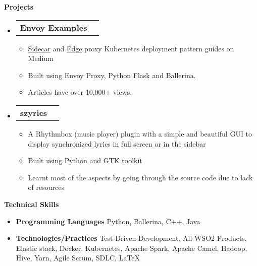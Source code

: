 \documentclass[letterpaper,12pt]{article}[leftmargin=*]
\makeatletter
\def \entryspacing {-0pt}
\renewcommand{\section}[2]{\vspace{5pt}
  \colorbox{secondary}{\color{white}\raggedbottom\normalsize\textbf{{#1}{\hspace{7pt}#2}}}
}
\newcommand{\resumeEntryStart}{\begin{itemize}[leftmargin=2.5mm]}
\newcommand{\resumeEntryEnd}{\end{itemize}\vspace{\entryspacing}}
\newcommand{\resumeItemListStart}{\begin{itemize}[leftmargin=4.5mm]}
\newcommand{\resumeItemListEnd}{\end{itemize}}
\newcommand{\resumeItem}[1]{
  \item\small{
    {#1 \vspace{-2pt}}
  }
}
\newcommand{\resumeEntryTD}[2]{
  \vspace{-1pt}\item[]
    \begin{tabularx}{0.97\textwidth}{X@{\hspace{60pt}}r}
      \textbf{\color{primary}#1} & {\firabook\color{accent}\small#2} \\
    \end{tabularx}\vspace{-6pt}
}
\newcommand{\resumeEntryS}[2]{
  \item[]\small{
    \textbf{\color{primary}#1 }{ #2 \vspace{-6pt}}
  }
}
\makeatother
\begin{document}
\section{\faFlask}{Projects}

  \resumeEntryStart
    \resumeEntryTD
      {Envoy Examples}{}
    \resumeItemListStart
      \resumeItem {\href{https://medium.com/@viggnah/how-to-deploy-envoy-as-a-sidecar-proxy-on-kubernetes-c3a3ad3935ee}{Sidecar} and \href{https://medium.com/@viggnah/how-to-deploy-envoy-as-an-edge-proxy-on-kubernetes-f1af78e1ebfb}{Edge} proxy Kubernetes deployment pattern guides on Medium}
      \resumeItem {Built using Envoy Proxy, Python Flask and Ballerina.}
      \resumeItem {Articles have over 10,000+ views.}
    \resumeItemListEnd

    \resumeEntryTD
      {szyrics}{}
    \resumeItemListStart
      \resumeItem {A Rhythmbox (music player) plugin with a simple and beautiful GUI to display synchronized lyrics in full screen or in the sidebar}
      \resumeItem {Built using Python and GTK toolkit}
      \resumeItem {Learnt most of the aspects by going through the source code due to lack of resources}
    \resumeItemListEnd
  \resumeEntryEnd


\section{\faStar}{Technical Skills}
 \resumeEntryStart
  \resumeEntryS{Programming Languages} {Python, Ballerina, C++, Java}
  \resumeEntryS{Technologies/Practices} {Test-Driven Development, All WSO2 Products, Elastic stack, Docker, Kubernetes, Apache Spark, Apache Camel, Hadoop, Hive, Yarn, Agile Scrum, SDLC, \LaTeX}
 \resumeEntryEnd
 
\end{document}
